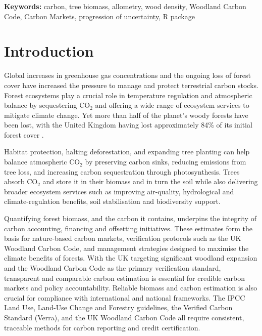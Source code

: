 \documentclass[12pt,a4paper]{article}
\begin{document}
\noindent\textbf{Keywords:} carbon, tree biomass, allometry, wood density, Woodland Carbon Code, Carbon Markets, progression of uncertainty, R package

\section{Introduction}

Global increases in greenhouse gas concentrations and the ongoing loss of forest cover have increased the pressure to manage and protect terrestrial carbon stocks. Forest ecosystems play a crucial role in temperature regulation and atmospheric balance by sequestering CO$_2$ and offering a wide range of ecosystem services to mitigate climate change. Yet more than half of the planet's woody forests have been lost, with the United Kingdom having lost approximately 84\% of its initial forest cover \citep{Watts2006}.

Habitat protection, halting deforestation, and expanding tree planting can help balance atmospheric CO$_2$ by preserving carbon sinks, reducing emissions from tree loss, and increasing carbon sequestration through photosynthesis. Trees absorb CO$_2$ and store it in their biomass and in turn the soil while also delivering broader ecosystem services such as improving air-quality, hydrological and climate-regulation benefits, soil stabilisation and biodiversity support.

Quantifying forest biomass, and the carbon it contains, underpins the integrity of carbon accounting, financing and offsetting initiatives. These estimates form the basis for nature-based carbon markets, verification protocols such as the UK Woodland Carbon Code, and management strategies designed to maximise the climate benefits of forests. With the UK targeting significant woodland expansion and the Woodland Carbon Code as the primary verification standard, transparent and comparable carbon estimation is essential for credible carbon markets and policy accountability. Reliable biomass and carbon estimation is also crucial for compliance with international and national frameworks. The IPCC Land Use, Land-Use Change and Forestry guidelines, the Verified Carbon Standard (Verra), and the UK Woodland Carbon Code all require consistent, traceable methods for carbon reporting and credit certification.
\end{document}
